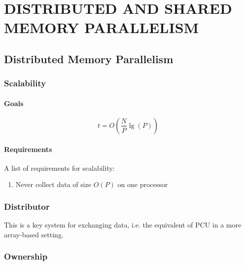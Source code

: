 
\chapter{DISTRIBUTED AND SHARED MEMORY PARALLELISM}

\section{Distributed Memory Parallelism}

\subsection{Scalability}

\subsubsection{Goals}

\begin{equation} \label{eq:big-o-scale}
t = O(\frac{N}{P}\lg(P))
\end{equation}

\subsubsection{Requirements}

A list of requirements for scalability:

\begin{enumerate}
\item Never collect data of size $O(P)$ on one processor
\end{enumerate}

\subsection{Distributor}

This is a key system for exchanging data, i.e.
the equivalent of PCU in a more array-based setting.

\subsection{Ownership}

